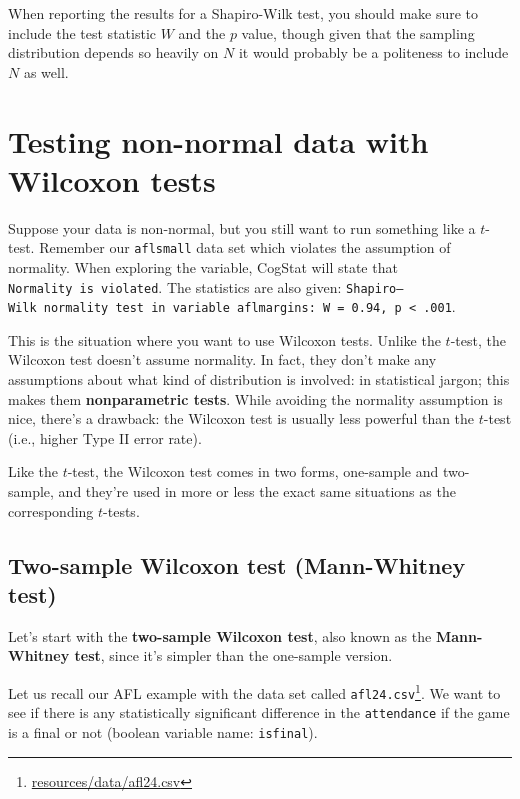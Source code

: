\documentclass[
  11pt,
  a4paper,
  twoside,symmetric,openright]{book}
\theoremstyle{break}
\theoremstyle{break}
\DeclareRobustCommand{\href}[2]{#2\footnote{\url{#1}}}
\begin{document}
When reporting the results for a Shapiro-Wilk test, you should make sure to include the test statistic \(W\) and the \(p\) value, though given that the sampling distribution depends so heavily on \(N\) it would probably be a politeness to include \(N\) as well.

\section{Testing non-normal data with Wilcoxon tests}\label{wilcox}

Suppose your data is non-normal, but you still want to run something like a \(t\)-test. Remember our \texttt{aflsmall} data set which violates the assumption of normality. When exploring the variable, CogStat will state that \texttt{Normality\ is\ violated}. The statistics are also given: \texttt{Shapiro–Wilk\ normality\ test\ in\ variable\ aflmargins:\ W\ =\ 0.94,\ p\ \textless{}\ .001}.

This is the situation where you want to use Wilcoxon tests. Unlike the \(t\)-test, the Wilcoxon test doesn't assume normality. In fact, they don't make any assumptions about what kind of distribution is involved: in statistical jargon; this makes them \textbf{nonparametric tests}. While avoiding the normality assumption is nice, there's a drawback: the Wilcoxon test is usually less powerful than the \(t\)-test (i.e., higher Type II error rate).

Like the \(t\)-test, the Wilcoxon test comes in two forms, one-sample and two-sample, and they're used in more or less the exact same situations as the corresponding \(t\)-tests.

\subsection{Two-sample Wilcoxon test (Mann-Whitney test)}\label{mannwhitney}

Let's start with the \textbf{two-sample Wilcoxon test}, also known as the \textbf{Mann-Whitney test}, since it's simpler than the one-sample version.

Let us recall our AFL example with the data set called \href{resources/data/afl24.csv}{\texttt{afl24.csv}}. We want to see if there is any statistically significant difference in the \texttt{attendance} if the game is a final or not (boolean variable name: \texttt{isfinal}).
\end{document}
